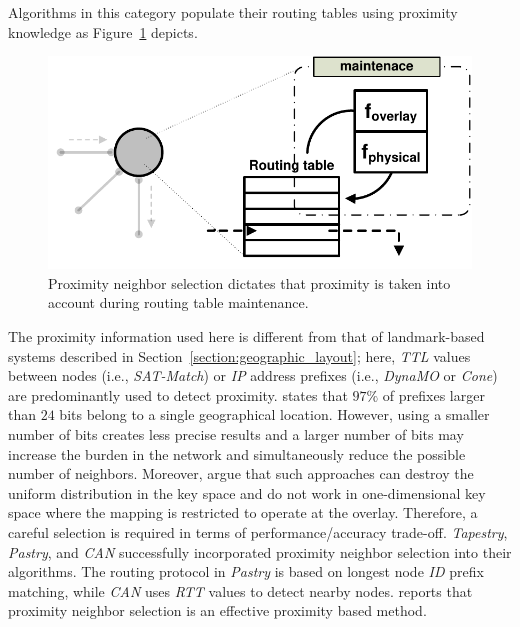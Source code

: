 Algorithms in this category populate their routing tables using
proximity knowledge as Figure~\ref{figure:proximity-neighbour-selection} 
depicts. 
\begin{figure}[ht]
\centering
  \includegraphics[scale=0.4]{img/pdf/proximity-neighbor-selection.pdf}
\caption{Proximity neighbor selection dictates that proximity is taken into
account during routing table maintenance.}
\label{figure:proximity-neighbour-selection}
\end{figure}
The proximity information used here is different from that of 
landmark-based systems described in Section~\ref{section:geographic_layout};
here, \emph{TTL} values between nodes (i.e., \emph{SAT-Match}) or 
\emph{IP} address prefixes (i.e., \emph{DynaMO} or \emph{Cone}) 
are predominantly used to detect proximity. 
\cite{freedman_iploc_2005} states that $97\%$ of prefixes larger
than $24$ bits belong to a single geographical location. 
However, using a smaller number of bits creates less precise results 
and a larger number of bits may increase the burden in the network
and simultaneously reduce the possible number of neighbors. 
Moreover, \cite{HLYW2005} argue that such approaches can
destroy the uniform distribution in the key space and do not work in
one-dimensional key space where the mapping is restricted to 
operate at the overlay.
Therefore, a careful selection is required in terms of
performance/accuracy trade-off. 
\emph{Tapestry}, \emph{Pastry}, and \emph{CAN} successfully incorporated
proximity neighbor selection into their algorithms. 
The routing protocol in \emph{Pastry} is based on longest node 
\emph{ID} prefix matching, while \emph{CAN} uses \emph{RTT} values to
detect nearby nodes. \cite{CDCR2002a} reports that proximity neighbor
selection is an effective proximity based method.



